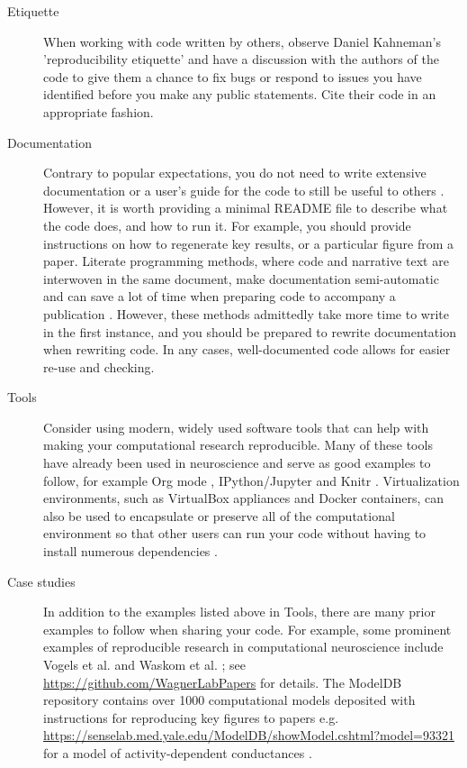\documentclass[11pt]{article}
\begin{document}
\begin{description}
\item [Etiquette] When working with code written by others, observe
  Daniel Kahneman's 'reproducibility etiquette'\cite{Kahneman2014} and
  have a discussion with the authors of the code to give them a chance
  to fix bugs or respond to issues you have identified before you make
  any public statements.  Cite their code in an appropriate fashion.


\item [Documentation] Contrary to popular expectations, you do not
  need to write extensive documentation or a user's guide for the code
  to still be useful to others \cite{Barnes2010-iv}.  However, it is
  worth providing a minimal README file to describe what the code
  does, and how to run it.  For example, you should provide
  instructions on how to regenerate key results, or a particular
  figure from a paper. Literate programming methods, where code and
  narrative text are interwoven in the same document, make
  documentation semi-automatic and can save a lot of time when
  preparing code to accompany a publication \cite{schulte2012multi,
    gentleman2012statistical}. However, these methods admittedly take
  more time to write in the first instance, and you should be prepared
  to rewrite documentation when rewriting code.  In any cases,
  well-documented code allows for easier re-use and checking.

\item [Tools] Consider using modern, widely used software tools that
  can help with making your computational research reproducible.  Many
  of these tools have already been used in neuroscience and serve as
  good examples to follow, for example Org mode \cite{Delescluse2011},
  IPython/Jupyter \cite{Stevens2013} and Knitr \cite{Eglen2014}.
  Virtualization environments, such as VirtualBox appliances and
  Docker containers, can also be used to encapsulate or preserve all
  of the computational environment so that other users can run your
  code without having to install numerous dependencies
  \cite{Boettiger2015}.


\item [Case studies] In addition to the examples listed above in
  Tools\cite{Delescluse2011,Stevens2013,Eglen2014}, there are many
  prior examples to follow when sharing your code.  For example, some
  prominent examples of reproducible research in computational
  neuroscience include Vogels et al. \cite{Vogels2011-c8c} and Waskom
  et al. \cite{Waskom2014-gd}; see
  \url{https://github.com/WagnerLabPapers} for details.  The ModelDB
  repository contains over 1000 computational models deposited with
  instructions for reproducing key figures to papers
  e.g. \url{https://senselab.med.yale.edu/ModelDB/showModel.cshtml?model=93321}
  for a model of activity-dependent conductances \cite{Liu1998}.




\end{description}
\end{document}
